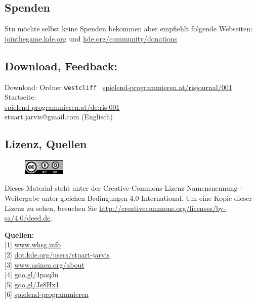 \documentclass[10pt,a4paper,ngerman,twoside]{article} %
\newcommand{\SepRule}{\noindent	%
\begin{center}
\rule{250pt}{1pt} %
\end{center}
}
\begin{document}
\begin{multicols}{3}
\subsection*{Spenden}
Stu möchte selbst keine Spenden bekommen aber empfiehlt folgende Webseiten:
\href{http://jointhegame.kde.org}{jointhegame.kde.org} und \href{http://www.kde.org/community/donations/index.php}{kde.org/community/donations}

\subsection*{Download, Feedback:}
\footnotesize{
Download: Ordner \texttt{westcliff} \Mundus\ \href{http://spielend-programmieren.at/risjournal/001}{spielend-programmieren.at/risjournal/001}\\
Startseite:\\
\href{http://spielend-programmieren.at/de:ris:001}{spielend-programmieren.at/de:ris:001}\\ 
\Letter\: stuart.jarvis@gmail.com (Englisch)\\}
\normalsize
 
\subsection*{Lizenz, Quellen}
\begin{figure}
\includegraphics[width=2cm]{ccbysa88x31.png} \\ 
\end{figure}
Dieses Material steht unter der Creative-Commons-Lizenz Namensnennung - Weitergabe unter gleichen Bedingungen 4.0 International. Um eine Kopie dieser Lizenz zu sehen, besuchen Sie \url{http://creativecommons.org/licenses/by-sa/4.0/deed.de}.

\textbf{Quellen:} \\
{[}1{]} \href{http://www.whsg.info}{www.whsg.info} \\
{[}2{]} \href{http://dot.kde.org/users/stuart-jarvis}{dot.kde.org/users/stuart-jarvis} \\
{[}3{]} \href{http://www.asinen.org/about/}{www.asinen.org/about} \\
{[}4{]} \href{http://goo.gl/4paq3n}{goo.gl/4paq3n} \\
{[}5{]} \href{http://goo.gl/Je8Hx1}{goo.gl/Je8Hx1} \\
{[}6{]} \href{http://spielend-programmieren.at}{spielend-programmieren}

\end{multicols}
\end{document}
